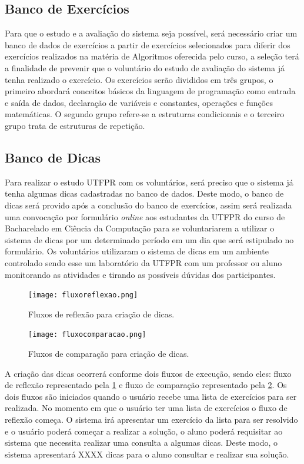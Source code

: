 \subsection{Banco de Exercícios}

Para que o estudo e a avaliação do sistema seja possível, será necessário criar um banco de dados de exercícios a partir de exercícios selecionados para diferir dos exercícios realizados na matéria de Algoritmos oferecida pelo curso, a seleção terá a finalidade de prevenir que o voluntário do estudo de avaliação do sistema já tenha realizado o exercício. Os exercícios serão divididos em três grupos, o primeiro abordará conceitos básicos da linguagem de programação como entrada e saída de dados, declaração de variáveis e constantes, operações e funções matemáticas. O segundo grupo refere-se a estruturas condicionais e o terceiro grupo trata de estruturas de repetição.

\subsection{Banco de Dicas}

Para realizar o estudo UTFPR com os voluntários, será preciso que o sistema já tenha algumas dicas cadastradas no banco de dados. Deste modo, o banco de dicas será provido após a conclusão do banco de exercícios, assim será realizada uma convocação por formulário \textit{online} aos estudantes da UTFPR do curso de Bacharelado em Ciência da Computação para se voluntariarem a utilizar o sistema de dicas por um determinado período em um dia que será estipulado no formulário. Os voluntários utilizaram o sistema de dicas em um ambiente controlado sendo esse um laboratório da UTFPR com um professor ou aluno monitorando as atividades e tirando as possíveis dúvidas dos participantes. 

\begin{figure}[]
	\centering
	\captionsetup{justification=centering}
	\texttt{[image: fluxoreflexao.png]}
	\caption{Fluxos de reflexão para criação de dicas.}
	\label{figura:fluxoreflexao}
\end{figure}

\begin{figure}[]
	\centering
	\captionsetup{justification=centering}
	\texttt{[image: fluxocomparacao.png]}
	\caption{Fluxos de comparação para criação de dicas.}
	\label{figura:fluxocomparacao}
\end{figure}

A criação das dicas ocorrerá conforme dois fluxos de execução, sendo eles: fluxo de reflexão representado pela \cref{figura:fluxoreflexao} e fluxo de comparação representado pela \cref{figura:fluxocomparacao}. Os dois fluxos são iniciados quando o usuário recebe uma lista de exercícios para ser realizada. No momento em que o usuário ter uma lista de exercícios o fluxo de reflexão começa. O sistema irá apresentar um exercício da lista para ser resolvido e o usuário poderá começar a realizar a solução, o aluno poderá requisitar ao sistema que necessita realizar uma consulta a algumas dicas. Deste modo, o sistema apresentará XXXX dicas para o aluno consultar e realizar sua solução.

